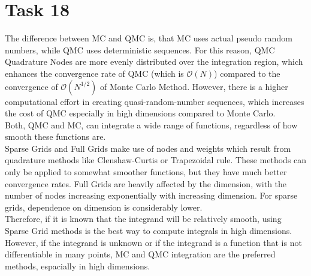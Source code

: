 \documentclass[10pt,a4paper]{article}
\begin{document}
\section*{Task 18}

The difference between MC and QMC is, that MC uses actual pseudo random numbers, while QMC uses deterministic sequences. For this reason, QMC Quadrature Nodes are more evenly distributed over the integration region, which enhances the convergence rate of QMC (which is $\mathcal{O}(N)$) compared to the convergence of $\mathcal{O}(N^{1/2})$ of Monte Carlo Method. However, there is a higher computational effort in creating quasi-random-number sequences, which increases the cost of QMC especially in high dimensions compared to Monte Carlo. \\

Both, QMC and MC, can integrate a wide range of functions, regardless of how smooth these functions are. \\

Sparse Grids and Full Grids make use of nodes and weights which result from quadrature methods like Clenshaw-Curtis or Trapezoidal rule. These methods can only be applied to somewhat smoother functions, but they have much better convergence rates. 
Full Grids are heavily affected by the dimension, with the number of nodes increasing exponentially with increasing dimension. For sparse grids, dependence on dimension is considerably lower. \\

Therefore, if it is known that the integrand will be relatively smooth, using Sparse Grid methods is the best way to compute integrals in high dimensions. However, if the integrand is unknown or if the integrand is a function that is not differentiable in many points, MC and QMC integration are the preferred methods, espacially in high dimensions.
\end{document}
